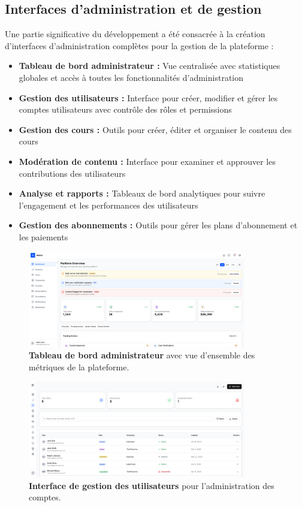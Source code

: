 \subsection{Interfaces d'administration et de gestion}

Une partie significative du développement a été consacrée à la création d'interfaces d'administration complètes pour la gestion de la plateforme :

\begin{itemize}
  \item \textbf{Tableau de bord administrateur :} Vue centralisée avec statistiques globales et accès à toutes les fonctionnalités d'administration
  \item \textbf{Gestion des utilisateurs :} Interface pour créer, modifier et gérer les comptes utilisateurs avec contrôle des rôles et permissions
  \item \textbf{Gestion des cours :} Outils pour créer, éditer et organiser le contenu des cours
  \item \textbf{Modération de contenu :} Interface pour examiner et approuver les contributions des utilisateurs
  \item \textbf{Analyse et rapports :} Tableaux de bord analytiques pour suivre l'engagement et les performances des utilisateurs
  \item \textbf{Gestion des abonnements :} Outils pour gérer les plans d'abonnement et les paiements
\end{itemize}

\begin{figure}[H]
  \centering
  \includegraphics[width=0.85\textwidth,keepaspectratio]{old-reports/week_4_img/admin.jpeg}
  \caption{\textbf{Tableau de bord administrateur} avec vue d'ensemble des métriques de la plateforme.}
  \label{fig:admin_dashboard}
\end{figure}

\begin{figure}[H]
  \centering
  \includegraphics[width=0.85\textwidth,keepaspectratio]{old-reports/week_4_img/usrmana.jpeg}
  \caption{\textbf{Interface de gestion des utilisateurs} pour l'administration des comptes.}
  \label{fig:user_management}
\end{figure}

